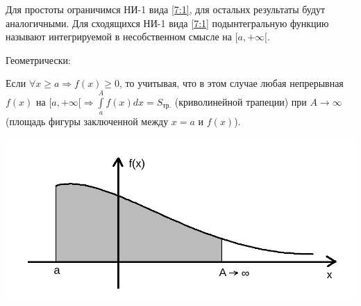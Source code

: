 \documentclass[../../main.tex]{subfiles}
\begin{document}
Для простоты ограничимся НИ-1 вида \eqref{7:1}, для остальнх результаты будут
аналогичными. Для сходящихся НИ-1 вида \eqref{7:1} подынтегральную функцию 
называют интегрируемой в несобственном смысле на $[a, +\infty[$.

Геометрически:

Если $\forall x \geq a \Longrightarrow f(x) \geq 0$, то учитывая, что в этом
случае любая непрерывная $f(x)$ на $[a, +\infty[ \Longrightarrow
\int\limits_a^A f(x)dx = S_{\text{тр.}}$ (криволинейной трапеции) при
$A \to \infty$ (площадь фигуры заключенной между $x = a$ и $f(x)$).

\includegraphics[scale = 0.3]{lec7_1.png}
\end{document}
